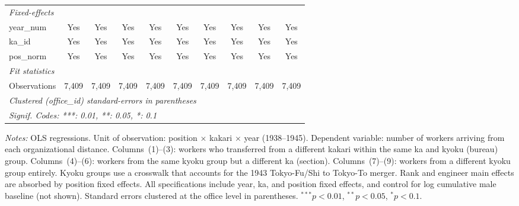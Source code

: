 \begin{table}[htbp]
\begin{threeparttable}
\begin{tabular}{lccccccccc}
   \midrule
   \emph{Fixed-effects}\\
   year\_num                      & Yes      & Yes            & Yes            & Yes            & Yes             & Yes            & Yes           & Yes            & Yes\\  
   ka\_id                         & Yes      & Yes            & Yes            & Yes            & Yes             & Yes            & Yes           & Yes            & Yes\\  
   pos\_norm                      & Yes      & Yes            & Yes            & Yes            & Yes             & Yes            & Yes           & Yes            & Yes\\  
   \midrule
   \emph{Fit statistics}\\
   Observations                   & 7,409    & 7,409          & 7,409          & 7,409          & 7,409           & 7,409          & 7,409         & 7,409          & 7,409\\  
   \midrule \midrule
   \multicolumn{10}{l}{\emph{Clustered (office\_id) standard-errors in parentheses}}\\
   \multicolumn{10}{l}{\emph{Signif. Codes: ***: 0.01, **: 0.05, *: 0.1}}\\
\end{tabular}
\begin{tablenotes}[flushleft]
\footnotesize
\item \textit{Notes:} OLS regressions. Unit of observation: position $\times$ kakari $\times$ year (1938--1945). Dependent variable: number of workers arriving from each organizational distance. Columns~(1)--(3): workers who transferred from a different kakari within the same ka and kyoku (bureau) group. Columns~(4)--(6): workers from the same kyoku group but a different ka (section). Columns~(7)--(9): workers from a different kyoku group entirely. Kyoku groups use a crosswalk that accounts for the 1943 Tokyo-Fu/Shi to Tokyo-To merger. Rank and engineer main effects are absorbed by position fixed effects. All specifications include year, ka, and position fixed effects, and control for log cumulative male baseline (not shown). Standard errors clustered at the office level in parentheses. $^{***}p<0.01$, $^{**}p<0.05$, $^{*}p<0.1$.
\end{tablenotes}
\end{threeparttable}
\end{table}
